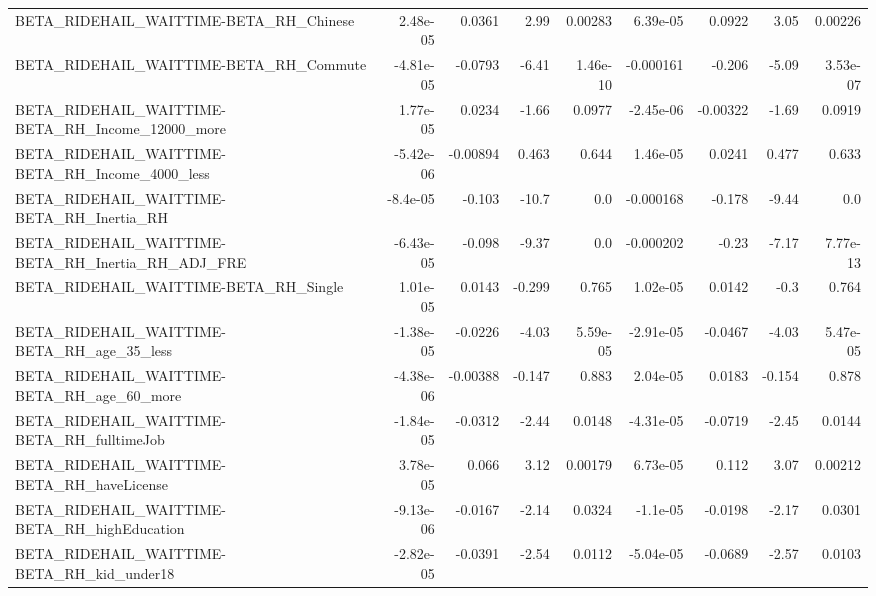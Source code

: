 \begin{tabular}{lrrrrrrrr}
BETA\_RIDEHAIL\_WAITTIME-BETA\_RH\_Chinese             &    2.48e-05 &       0.0361 &     2.99 &  0.00283 &   6.39e-05 &      0.0922 &         3.05 &       0.00226 \\
BETA\_RIDEHAIL\_WAITTIME-BETA\_RH\_Commute             &   -4.81e-05 &      -0.0793 &    -6.41 & 1.46e-10 &  -0.000161 &      -0.206 &        -5.09 &      3.53e-07 \\
BETA\_RIDEHAIL\_WAITTIME-BETA\_RH\_Income\_12000\_more   &    1.77e-05 &       0.0234 &    -1.66 &   0.0977 &  -2.45e-06 &    -0.00322 &        -1.69 &        0.0919 \\
BETA\_RIDEHAIL\_WAITTIME-BETA\_RH\_Income\_4000\_less    &   -5.42e-06 &     -0.00894 &    0.463 &    0.644 &   1.46e-05 &      0.0241 &        0.477 &         0.633 \\
BETA\_RIDEHAIL\_WAITTIME-BETA\_RH\_Inertia\_RH          &    -8.4e-05 &       -0.103 &    -10.7 &      0.0 &  -0.000168 &      -0.178 &        -9.44 &           0.0 \\
BETA\_RIDEHAIL\_WAITTIME-BETA\_RH\_Inertia\_RH\_ADJ\_FRE  &   -6.43e-05 &       -0.098 &    -9.37 &      0.0 &  -0.000202 &       -0.23 &        -7.17 &      7.77e-13 \\
BETA\_RIDEHAIL\_WAITTIME-BETA\_RH\_Single              &    1.01e-05 &       0.0143 &   -0.299 &    0.765 &   1.02e-05 &      0.0142 &         -0.3 &         0.764 \\
BETA\_RIDEHAIL\_WAITTIME-BETA\_RH\_age\_35\_less         &   -1.38e-05 &      -0.0226 &    -4.03 & 5.59e-05 &  -2.91e-05 &     -0.0467 &        -4.03 &      5.47e-05 \\
BETA\_RIDEHAIL\_WAITTIME-BETA\_RH\_age\_60\_more         &   -4.38e-06 &     -0.00388 &   -0.147 &    0.883 &   2.04e-05 &      0.0183 &       -0.154 &         0.878 \\
BETA\_RIDEHAIL\_WAITTIME-BETA\_RH\_fulltimeJob         &   -1.84e-05 &      -0.0312 &    -2.44 &   0.0148 &  -4.31e-05 &     -0.0719 &        -2.45 &        0.0144 \\
BETA\_RIDEHAIL\_WAITTIME-BETA\_RH\_haveLicense         &    3.78e-05 &        0.066 &     3.12 &  0.00179 &   6.73e-05 &       0.112 &         3.07 &       0.00212 \\
BETA\_RIDEHAIL\_WAITTIME-BETA\_RH\_highEducation       &   -9.13e-06 &      -0.0167 &    -2.14 &   0.0324 &   -1.1e-05 &     -0.0198 &        -2.17 &        0.0301 \\
BETA\_RIDEHAIL\_WAITTIME-BETA\_RH\_kid\_under18         &   -2.82e-05 &      -0.0391 &    -2.54 &   0.0112 &  -5.04e-05 &     -0.0689 &        -2.57 &        0.0103 \\

\end{tabular}
